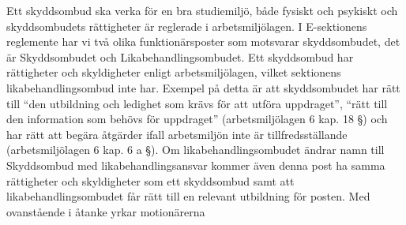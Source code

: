 \documentclass[../_main/handlingar.tex]{subfiles}
\begin{document}
Ett skyddsombud ska verka för en bra studiemiljö, både fysiskt och psykiskt och
skyddsombudets rättigheter är reglerade i arbetsmiljölagen. I E-sektionens reglemente har vi två olika funktionärsposter som motsvarar skyddsombudet, det är Skyddsombudet och Likabehandlingsombudet. Ett skyddsombud har rättigheter och skyldigheter enligt arbetsmiljölagen, vilket sektionens likabehandlingsombud inte har. Exempel på detta är att skyddsombudet har rätt till ``den utbildning och ledighet som krävs för att utföra uppdraget'',
``rätt till den information som behövs för uppdraget'' (arbetsmiljölagen 6 kap. 18 \S) och har rätt att begära åtgärder ifall arbetsmiljön inte är tillfredsställande (arbetsmiljölagen 6 kap. 6 a \S).
Om likabehandlingsombudet ändrar namn till Skyddsombud med likabehandlingsansvar
kommer även denna post ha samma rättigheter och skyldigheter som ett skyddsombud samt att likabehandlingsombudet får rätt till en relevant utbildning för posten. Med ovanstående i åtanke yrkar motionärerna
\end{document}
